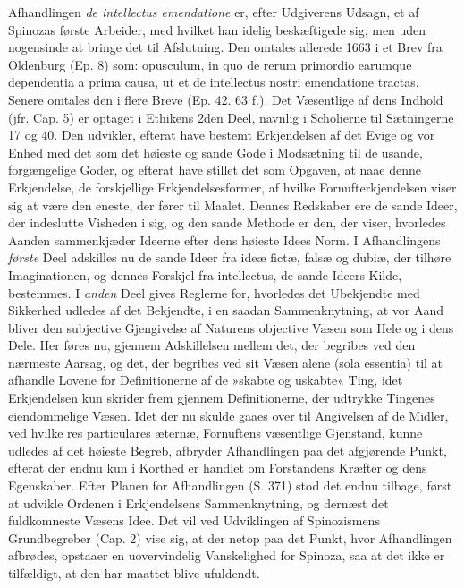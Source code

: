 \documentclass[12pt,a4paper]{book}
\newcommand{\opage}[1]{\marginnote{\footnotesize\textit{[#1]}}}
\begin{document}
\opage{38} Afhandlingen \emph{de intellectus emendatione} er, efter Udgiverens
Udsagn, et af Spinozas første Arbeider, med hvilket han idelig
beskæftigede sig, men uden nogensinde at bringe det til Afslutning. Den
omtales allerede 1663 i et Brev fra Oldenburg (Ep. 8) som: opusculum, in
quo de rerum primordio earumque dependentia a prima causa, ut et de
intellectus nostri emendatione tractas. Senere omtales den i flere Breve
(Ep. 42. 63 f.). Det Væsentlige af dens Indhold (jfr. Cap. 5) er optaget i
Ethikens 2den Deel, navnlig i Scholierne til Sætningerne 17 og 40. Den
udvikler, efterat have bestemt Erkjendelsen af det Evige og vor Enhed med
det som det høieste og sande Gode i Modsætning til de usande,
forgængelige Goder, og efterat have stillet det som Opgaven, at naae denne
Erkjendelse, de forskjellige Erkjendelsesformer, af hvilke
Fornufterkjendelsen viser sig at være den eneste, der fører til Maalet.
Dennes Redskaber ere de sande Ideer, der indeslutte Visheden i sig, og den
sande Methode er den, der viser, hvorledes Aanden sammenkjæder Ideerne
efter dens høieste Idees Norm. I Afhandlingens \emph{første} Deel
adskilles nu de sande Ideer fra ideæ fictæ, falsæ og dubiæ, der tilhøre
Imaginationen, og dennes Forskjel fra intellectus, de sande Ideers Kilde,
bestemmes. I \emph{anden} Deel gives Reglerne for, hvorledes det
Ubekjendte med Sikkerhed udledes af det Bekjendte, i en saadan
Sammenknytning, at vor Aand bliver den subjective Gjengivelse af Naturens
objective Væsen som Hele og i dens Dele. Her føres nu, gjennem
Adskillelsen mellem det, der begribes ved den nærmeste Aarsag, og det, der
begribes ved sit Væsen alene (sola essentia) til at afhandle Lovene for
Definitionerne af de »skabte og uskabte« Ting, idet Erkjendelsen kun
skrider frem gjennem Definitionerne, der udtrykke Tingenes eiendommelige
Væsen. Idet der nu skulde gaaes over til Angivelsen af de Midler, ved
hvilke res particulares æternæ, Fornuftens væsentlige Gjenstand, kunne
udledes af det høieste Begreb, afbryder Afhandlingen paa det afgjørende
Punkt, efterat der endnu kun i Korthed er handlet om Forstandens Kræfter
og dens Egenskaber.
\opage{39} Efter Planen for Afhandlingen (S. 371) stod det endnu tilbage, først at
udvikle Ordenen i Erkjendelsens Sammenknytning, og dernæst det
fuldkomneste Væsens Idee. Det vil ved Udviklingen af Spinozismens
Grundbegreber (Cap. 2) vise sig, at der netop paa det Punkt, hvor
Afhandlingen afbrødes, opstaaer en uovervindelig Vanskelighed for Spinoza,
saa at det ikke er tilfældigt, at den har maattet blive ufuldendt.
\end{document}
